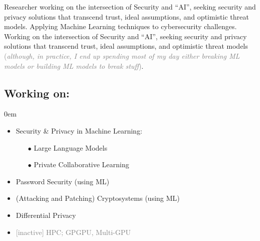 \documentclass[margin, 10pt]{article} %
\begin{document}


 
\vspace{.2cm}
 \ifita
 \noindent Researcher working on the intersection of Security and ``AI'', seeking security and privacy solutions that transcend trust, ideal assumptions, and optimistic threat models. Applying Machine Learning techniques to cybersecurity challenges.
 \else
  \noindent Working on the intersection of Security and ``AI'', seeking security and privacy solutions that transcend trust, ideal assumptions, and optimistic threat models \textcolor{gray}{(\textit{although, in practice, I end up spending most of my day either breaking ML models or building ML models to break stuff})}.
 \fi
 

\subsection*{Working on:} 
\itemsep0em 
\begin{itemize}
\itemsep0em 
\item Security \& Privacy in Machine Learning:
	\begin{itemize}
	\item[$\bullet$] Large Language Models \cite{nes, llmmap, hackai}
		\item[$\bullet$]  Private Collaborative Learning \cite{dl, CCS21, CCS22}  		
	\end{itemize}
\item Password Security (using ML) \cite{uncm, SP21, adam}
\item (Attacking and Patching) Cryptosystems (using ML) \cite{MIGP, CCS22} 
\item Differential Privacy \cite{uncm}
\item \textcolor{gray}{[inactive]
 HPC; GPGPU, Multi-GPU \cite{MONOAMG}}
\end{itemize}
\end{document}
